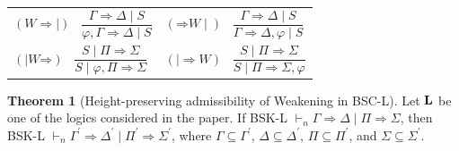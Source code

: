 \documentclass[11pt,a4paper,titlepage]{article}
\theoremstyle{definition}
\newtheorem{theorem}{\textbf{Theorem}}
\newcommand{\3}{\vspace{.3in}}
\newcommand{\2}{\vspace{.2in}}
\newcommand{\1}{\vspace{.1in}}
\newcommand{\5}{\vspace{.05in}}
\begin{document}
\noindent\begin{tabular}{ll}	
	$(\mathord{W}\mathord{\Rightarrow\mid})$ \ $\dfrac{\Gamma
		\Rightarrow \Delta \mid S}{\varphi, \Gamma \Rightarrow \Delta \mid S}$ &
	$(\mathord{\Rightarrow}\mathord{W\mid})$ \ $\dfrac{\Gamma
		\Rightarrow \Delta \mid S}{\Gamma
		\Rightarrow \Delta, \varphi \mid S}$\\[16pt]
	
	$(\mathord{\mid W}\mathord{\Rightarrow})$ \ $\dfrac{S \mid \Pi\Rightarrow\Sigma}{S\mid \varphi, \Pi\Rightarrow\Sigma}$ &
	$(\mathord{\mid\Rightarrow}\mathord{W})$ \ $\dfrac{S \mid \Pi\Rightarrow\Sigma}{S \mid \Pi\Rightarrow\Sigma, \varphi}$\\[16pt]	
\end{tabular}
\begin{theorem}[Height-preserving admissibility of Weakening in BSC-L]\label{Weakening}
Let $ \bf L$ be one of the logics considered in the paper. If BSK-L $ \vdash_n \Gamma\Rightarrow\Delta\mid\Pi\Rightarrow\Sigma$, then BSK-L $ \vdash_n \Gamma^\prime\Rightarrow\Delta^\prime\mid\Pi^\prime\Rightarrow\Sigma^\prime$, where $ \Gamma\subseteq\Gamma^\prime $, $ \Delta\subseteq\Delta^\prime $, $ \Pi\subseteq\Pi^\prime $, and $ \Sigma\subseteq\Sigma^\prime $.	
\end{theorem}
\end{document}
